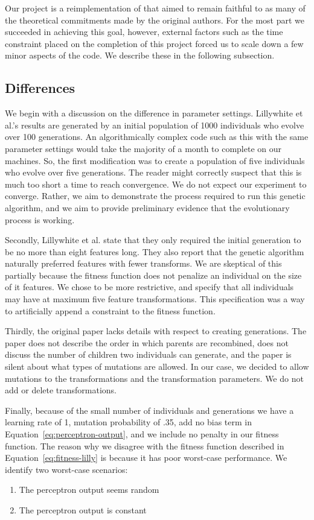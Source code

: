 \documentclass[conference]{IEEEtran}
\begin{document}
Our project is a reimplementation of \cite{lillywhite2013feature} that aimed to remain faithful to as many of the theoretical commitments made by the original authors. For the most part we succeeded in achieving this goal, however, external factors such as the time constraint placed on the completion of this project forced us to scale down a few minor aspects of the code. We describe these in the following subsection.

\subsection{Differences}
We begin with a discussion on the difference in parameter settings. Lillywhite et al.'s results are generated by an initial population of 1000 individuals who evolve over 100 generations. An algorithmically complex code such as this with the same parameter settings would take the majority of a month to complete on our machines. So, the first modification was to create a population of five individuals who evolve over five generations. The reader might correctly suspect that this is much too short a time to reach convergence. We do not expect our experiment to converge. Rather, we aim to demonstrate the process required to run this genetic algorithm, and we aim to provide preliminary evidence that the evolutionary process is working.

Secondly, Lillywhite et al. state that they only required the initial generation to be no more than eight features long. They also report that the genetic algorithm naturally preferred features with fewer transforms. We are skeptical of this partially because the fitness function does not penalize an individual on the size of it features. We chose to be more restrictive, and specify that all individuals may have at maximum five feature transformations. This specification was a way to artificially append a constraint to the fitness function.

Thirdly, the original paper lacks details with respect to creating generations. The paper does not describe the order in which parents are recombined, does not discuss the number of children two individuals can generate, and the paper is silent about what types of mutations are allowed. In our case, we decided to allow mutations to the transformations and the transformation parameters. We do not add or delete transformations.

Finally, because of the small number of individuals and generations we have a learning rate of 1, mutation probability of .35, add no bias term in Equation~\ref{eq:perceptron-output}, and we include no penalty in our fitness function. The reason why we disagree with the fitness function described in Equation~\ref{eq:fitness-lilly} is because it has poor worst-case performance. We identify two worst-case scenarios:
\begin{enumerate}
\item The perceptron output seems random
\item The perceptron output is constant
\end{enumerate}
\end{document}
